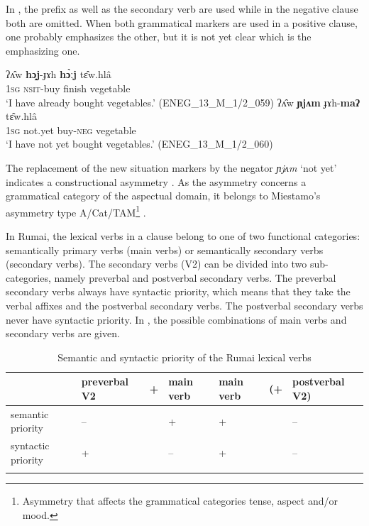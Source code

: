\documentclass[output=paper,colorlinks,citecolor=brown]{langscibook}
\begin{document}
In , the prefix as well as the secondary verb are used while in the negative clause  both are omitted. When both grammatical markers are used in a positive clause, one probably emphasizes the other, but it is not yet clear which is the emphasizing one.

\ea\label{ex:rum:10}
    \ea\label{ex:rum:10a}
        \gll ʔʌ̂w	\textbf{hɔ̰j}-ɟɤh	\textbf{hɔ̀ːj}	tɛ̂w.hlâ \\ 
              1\textsc{sg} \textsc{nsit}{}-buy finish vegetable \\
        \glt ‘I have already bought vegetables.’ (ENEG\_13\_M\_1/2\_059)
    \ex\label{ex:rum:10b}
        \gll ʔʌ̂w	\textbf{ɲjʌm}	ɟɤh-\textbf{maʔ}	tɛ̂w.hlâ \\
              1\textsc{sg} not.yet buy-\textsc{neg} vegetable \\
        \glt ‘I have not yet bought vegetables.’ (ENEG\_13\_M\_1/2\_060)
    \z
\z 

The replacement of the new situation markers by the negator \textit{ɲjʌm} ‘not yet’ indicates a constructional asymmetry \citep[52]{Miestamo2005}. As the asymmetry concerns a grammatical category of the aspectual domain, it belongs to Miestamo’s asymmetry type A/Cat/TAM\footnote{Asymmetry that affects the grammatical categories tense, aspect and/or mood.} \citep[116]{Miestamo2005}.

In Rumai, the lexical verbs in a clause belong to one of two functional categories: semantically primary verbs (main verbs) or semantically secondary verbs (secondary verbs). The secondary verbs (V2) can be divided into two sub-categories, namely preverbal and postverbal secondary verbs. The preverbal secondary verbs always have syntactic priority, which means that they take the verbal affixes and the postverbal secondary verbs. The postverbal secondary verbs never have syntactic priority. In , the possible combinations of main verbs and secondary verbs are given.

\begin{table}\small 
\begin{tabularx}{\textwidth}{llXllXl}
\lsptoprule
& preverbal V2 &+& main verb & main verb & (+& postverbal V2)\\
\midrule 
semantic priority  & – && + & + && –\\
syntactic priority & + && – & + && –\\
\lspbottomrule
\end{tabularx}
\caption{Semantic and syntactic priority of the Rumai lexical verbs}
\label{tab:rum:1}
\end{table}
\end{document}
